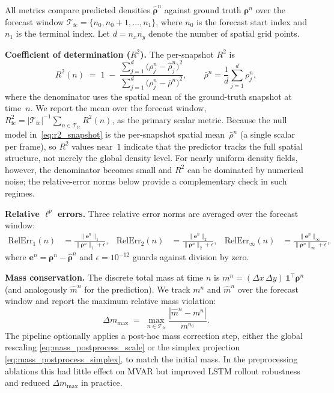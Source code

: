All metrics compare predicted densities $\hat{\boldsymbol{\rho}}^n$ against
ground truth $\boldsymbol{\rho}^n$ over the forecast window
$\mathcal{T}_{\mathrm{fc}} = \{n_0, n_0{+}1, \dots, n_1\}$, where $n_0$
is the forecast start index and $n_1$ is the terminal index.
Let $d = n_x n_y$ denote the number of spatial grid points.

\noindent\textbf{Coefficient of determination ($R^2$).}
\label{subsec:r2_time}
The per-snapshot $R^2$ is
\begin{equation}
  R^2(n) \;=\; 1 \;-\;
  \frac{\sum_{j=1}^{d}\bigl(\rho_j^n - \hat\rho_j^n\bigr)^2}
       {\sum_{j=1}^{d}\bigl(\rho_j^n - \bar\rho^n\bigr)^2},
  \qquad
  \bar\rho^n = \frac{1}{d}\sum_{j=1}^d \rho_j^n,
  \label{eq:r2_snapshot}
\end{equation}
where the denominator uses the spatial mean of the ground-truth snapshot at
time~$n$.  We report the mean over the forecast window,
$R^2_{\mathrm{fc}} = |\mathcal{T}_{\mathrm{fc}}|^{-1}\sum_{n\in\mathcal{T}_{\mathrm{fc}}} R^2(n)$,
as the primary scalar metric.
Because the null model in~\eqref{eq:r2_snapshot} is the per-snapshot
spatial mean~$\bar\rho^n$ (a single scalar per frame), so $R^2$ values
near~$1$ indicate that the predictor tracks the full spatial structure,
not merely the global density level.  For nearly uniform density fields,
however, the denominator becomes small and $R^2$ can be dominated by
numerical noise; the relative-error norms below provide a complementary
check in such regimes.

\noindent\textbf{Relative $\ell^p$ errors.}
\label{subsec:rel_errors}
Three relative error norms are
averaged over the
forecast window:
\begin{align}
  \mathrm{RelErr}_1(n) &= \frac{\|\boldsymbol{e}^n\|_1}{\|\boldsymbol{\rho}^n\|_1 + \epsilon},
  &
  \mathrm{RelErr}_2(n) &= \frac{\|\boldsymbol{e}^n\|_2}{\|\boldsymbol{\rho}^n\|_2 + \epsilon},
  &
  \mathrm{RelErr}_\infty(n) &= \frac{\|\boldsymbol{e}^n\|_\infty}{\|\boldsymbol{\rho}^n\|_\infty + \epsilon},
  \label{eq:rel_errors}
\end{align}
where $\boldsymbol{e}^n = \boldsymbol{\rho}^n - \hat{\boldsymbol{\rho}}^n$
and $\epsilon = 10^{-12}$ guards against division by zero.

\noindent\textbf{Mass conservation.}
\label{subsec:mass_metric}
The discrete total mass at time $n$ is
$m^n = (\Delta x\,\Delta y)\,\mathbf{1}^\top\boldsymbol{\rho}^n$ (and
analogously $\hat m^n$ for the prediction).  We track $m^n$ and $\hat m^n$
over the forecast window and report the maximum relative mass violation:
\begin{equation}
  \Delta m_{\max} \;=\;\max_{n\in\mathcal{T}_{\mathrm{fc}}}
    \frac{|\hat m^n - m^n|}{m^{n_0}}.
  \label{eq:mass_violation}
\end{equation}
The pipeline optionally applies a post-hoc mass correction step,
either the global rescaling
\eqref{eq:mass_postprocess_scale} or the simplex projection
\eqref{eq:mass_postprocess_simplex}, to match the initial mass.  In the
preprocessing ablations this had little effect on MVAR but improved LSTM
rollout robustness and reduced $\Delta m_{\max}$ in practice.

